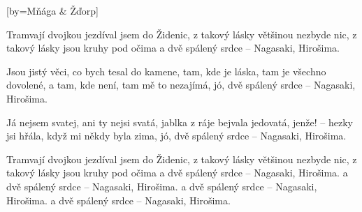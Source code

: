 [by={Mňága \& Žďorp}]

\beginchorus{}
Tramvají dvojkou jezdíval jsem do Židenic,   
z takový lásky většinou nezbyde nic,
z takový lásky jsou kruhy pod očima
a dvě spálený srdce -- Nagasaki, Hirošima.   
\endchorus{}

\beginverse{}
Jsou jistý věci, co bych tesal do kamene,   
tam, kde je láska, tam je všechno dovolené,
a tam, kde není, tam mě to nezajímá,
jó, dvě spálený srdce -- Nagasaki, Hirošima.   
\endverse{}

\beginverse{}
Já nejsem svatej, ani ty nejsi svatá,   
jablka z ráje bejvala jedovatá,
jenže! -- hezky jsi hřála, když mi někdy byla zima,
jó, dvě spálený srdce -- Nagasaki, Hirošima.   
\endverse{}

\beginchorus{}
Tramvají dvojkou jezdíval jsem do Židenic,   
z takový lásky většinou nezbyde nic,
z takový lásky jsou kruhy pod očima
a dvě spálený srdce -- Nagasaki, Hirošima.   
a dvě spálený srdce -- Nagasaki, Hirošima.   
a dvě spálený srdce -- Nagasaki, Hirošima.   
a dvě spálený srdce -- Nagasaki, Hirošima.   
\endchorus{}

\endsong{}
